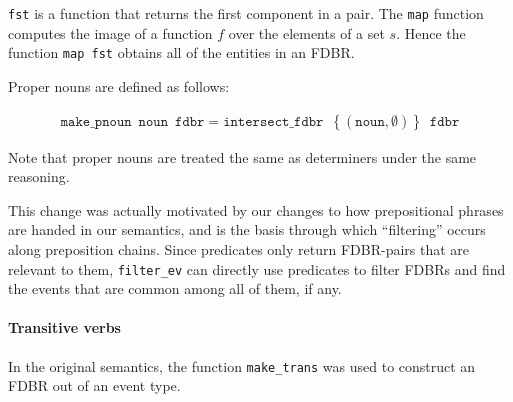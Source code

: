 \documentclass[../main.tex]{subfiles}
\begin{document}
\texttt{fst} is a function that returns the first component in a pair.  The \texttt{map} function computes the image of a function $f$ over the elements of a set $s$.  
Hence the function \texttt{map fst} obtains all of the entities in an FDBR.

Proper nouns are defined as follows:

\begin{gather*}
\mathtt{make\_pnoun}\enspace \mathtt{noun}\enspace \mathtt{fdbr} = \mathtt{intersect\_fdbr}\enspace \left\{(\mathtt{noun}, \mathtt{\emptyset})\right\} \enspace\mathtt{fdbr}
\end{gather*}

Note that proper nouns are treated the same as determiners under the same reasoning.

This change was actually motivated by our changes to how prepositional phrases are handed in our semantics, and is the basis through which
``filtering'' occurs along preposition chains.  Since predicates only return FDBR-pairs that are relevant to them, \texttt{filter\_ev} can directly
use predicates to filter FDBRs and find the events that are common among all of them, if any.

\paragraph{Transitive verbs}
\label{par:transitive}

In the original semantics, the function \texttt{make\_trans} was used to
construct an FDBR out of an event type.
\end{document}
